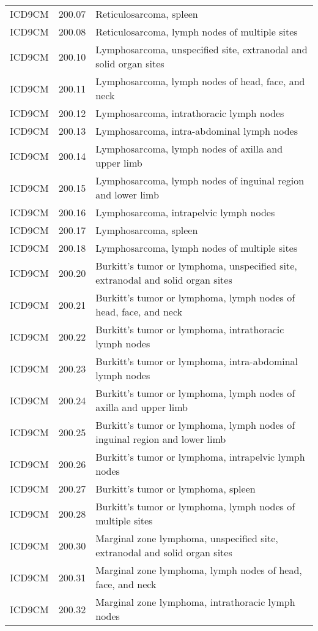 \begin{longtable}{p{}p{}p{}}
  ICD9CM & 200.07 & Reticulosarcoma, spleen \\ 
  ICD9CM & 200.08 & Reticulosarcoma, lymph nodes of multiple sites \\ 
  ICD9CM & 200.10 & Lymphosarcoma, unspecified site, extranodal and solid organ sites \\ 
  ICD9CM & 200.11 & Lymphosarcoma, lymph nodes of head, face, and neck \\ 
  ICD9CM & 200.12 & Lymphosarcoma, intrathoracic lymph nodes \\ 
  ICD9CM & 200.13 & Lymphosarcoma, intra-abdominal lymph nodes \\ 
  ICD9CM & 200.14 & Lymphosarcoma, lymph nodes of axilla and upper limb \\ 
  ICD9CM & 200.15 & Lymphosarcoma, lymph nodes of inguinal region and lower limb \\ 
  ICD9CM & 200.16 & Lymphosarcoma, intrapelvic lymph nodes \\ 
  ICD9CM & 200.17 & Lymphosarcoma, spleen \\ 
  ICD9CM & 200.18 & Lymphosarcoma, lymph nodes of multiple sites \\ 
  ICD9CM & 200.20 & Burkitt's tumor or lymphoma, unspecified site, extranodal and solid organ sites \\ 
  ICD9CM & 200.21 & Burkitt's tumor or lymphoma, lymph nodes of head, face, and neck \\ 
  ICD9CM & 200.22 & Burkitt's tumor or lymphoma, intrathoracic lymph nodes \\ 
  ICD9CM & 200.23 & Burkitt's tumor or lymphoma, intra-abdominal lymph nodes \\ 
  ICD9CM & 200.24 & Burkitt's tumor or lymphoma, lymph nodes of axilla and upper limb \\ 
  ICD9CM & 200.25 & Burkitt's tumor or lymphoma, lymph nodes of inguinal region and lower limb \\ 
  ICD9CM & 200.26 & Burkitt's tumor or lymphoma, intrapelvic lymph nodes \\ 
  ICD9CM & 200.27 & Burkitt's tumor or lymphoma, spleen \\ 
  ICD9CM & 200.28 & Burkitt's tumor or lymphoma, lymph nodes of multiple sites \\ 
  ICD9CM & 200.30 & Marginal zone lymphoma, unspecified site, extranodal and solid organ sites \\ 
  ICD9CM & 200.31 & Marginal zone lymphoma, lymph nodes of head, face, and neck \\ 
  ICD9CM & 200.32 & Marginal zone lymphoma, intrathoracic lymph nodes \\ 

\end{longtable}
